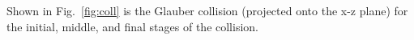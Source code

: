 \documentclass[12pt, letterpaper, twoside]{article}
\begin{document}
Shown in Fig.~\ref{fig:coll} is the Glauber collision (projected onto the x-z plane) for the initial, middle, and final stages of the collision. 

\begin{figure}[!hbt]

\begin{adjustbox}{max width=\linewidth,center}
\centering
{}%
%
%

\end{adjustbox}
\end{figure}
\end{document}
